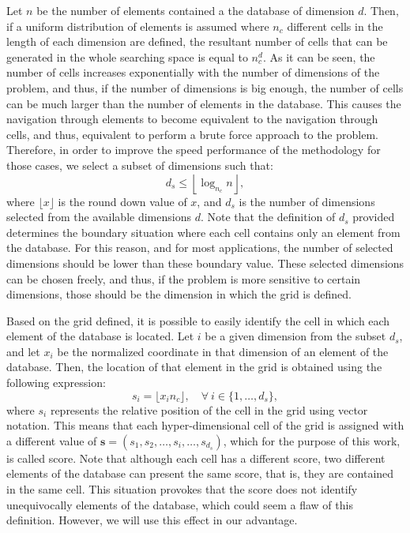 \documentclass[preprint,12pt]{elsarticle}
\begin{document}
Let $n$ be the number of elements contained a the database of dimension $d$. Then, if a uniform distribution of elements is assumed where $n_c$ different cells in the length of each dimension are defined, the resultant number of cells that can be generated in the whole searching space is equal to $n_c^d$. As it can be seen, the number of cells increases exponentially with the number of dimensions of the problem, and thus, if the number of dimensions is big enough, the number of cells can be much larger than the number of elements in the database. This causes the navigation through elements to become equivalent to the navigation through cells, and thus, equivalent to perform a brute force approach to the problem. Therefore, in order to improve the speed performance of the methodology for those cases, we select a subset of dimensions such that:
\begin{equation}
d_s \leq \left\lfloor\log_{n_c}n\right\rfloor,
\end{equation}
where $\lfloor x \rfloor$ is the round down value of $x$, and $d_s$ is the number of dimensions selected from the available dimensions $d$. Note that the definition of $d_s$ provided determines the boundary situation where each cell contains only an element from the database. For this reason, and for most applications, the number of selected dimensions should be lower than these boundary value. These selected dimensions can be chosen freely, and thus, if the problem is more sensitive to certain dimensions, those should be the dimension in which the grid is defined. 

Based on the grid defined, it is possible to easily identify the cell in which each element of the database is located. Let $i$ be a given dimension from the subset $d_s$, and let $x_i$ be the normalized coordinate in that dimension of an element of the database. Then, the location of that element in the grid is obtained using the following expression:
\begin{equation}\label{eq:v_score}
s_i = \lfloor x_i n_c \rfloor, \quad \forall \: i\in\{1,\dots,d_s\},
\end{equation}
where $s_i$ represents the relative position of the cell in the grid using vector notation. This means that each hyper-dimensional cell of the grid is assigned with a different value of $\mathbf{s} = (s_1, s_2, \dots, s_i, \dots, s_{d_s})$, which for the purpose of this work, is called score. Note that although each cell has a different score, two different elements of the database can present the same score, that is, they are contained in the same cell. This situation provokes that the score does not identify unequivocally elements of the database, which could seem a flaw of this definition. However, we will use this effect in our advantage.   
\end{document}
